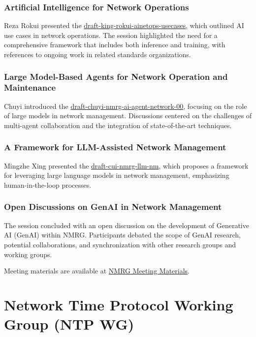 \documentclass{article}
\begin{document}
\subsubsection{Artificial Intelligence for Network Operations}
Reza Rokui presented the \href{https://datatracker.ietf.org/doc/html/draft-king-rokui-ainetops-usecases}{draft-king-rokui-ainetops-usecases}, which outlined AI use cases in network operations. The session highlighted the need for a comprehensive framework that includes both inference and training, with references to ongoing work in related standards organizations.

\subsubsection{Large Model-Based Agents for Network Operation and Maintenance}
Chuyi introduced the \href{https://datatracker.ietf.org/doc/html/draft-chuyi-nmrg-ai-agent-network-00}{draft-chuyi-nmrg-ai-agent-network-00}, focusing on the role of large models in network management. Discussions centered on the challenges of multi-agent collaboration and the integration of state-of-the-art techniques.

\subsubsection{A Framework for LLM-Assisted Network Management}
Mingzhe Xing presented the \href{https://datatracker.ietf.org/doc/html/draft-cui-nmrg-llm-nm}{draft-cui-nmrg-llm-nm}, which proposes a framework for leveraging large language models in network management, emphasizing human-in-the-loop processes.

\subsubsection{Open Discussions on GenAI in Network Management}
The session concluded with an open discussion on the development of Generative AI (GenAI) within NMRG. Participants debated the scope of GenAI research, potential collaborations, and synchronization with other research groups and working groups.

Meeting materials are available at \href{https://datatracker.ietf.org/meeting/122/session/nmrg}{NMRG Meeting Materials}.



\newpage

\section{Network Time Protocol Working Group (NTP WG)}
\end{document}
